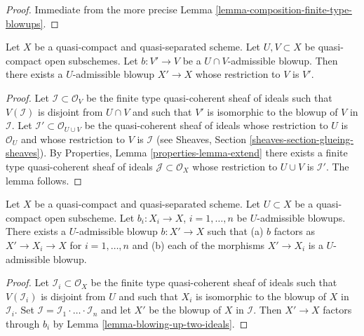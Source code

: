 \begin{proof}
Immediate from the more precise
Lemma \ref{lemma-composition-finite-type-blowups}.
\end{proof}

\begin{lemma}
\label{lemma-extend-admissible-blowups}
Let $X$ be a quasi-compact and quasi-separated scheme.
Let $U, V \subset X$ be quasi-compact open subschemes.
Let $b : V' \to V$ be a $U \cap V$-admissible blowup.
Then there exists a $U$-admissible blowup $X' \to X$
whose restriction to $V$ is $V'$.
\end{lemma}

\begin{proof}
Let $\mathcal{I} \subset \mathcal{O}_V$ be the finite type
quasi-coherent sheaf of ideals such that $V(\mathcal{I})$ is
disjoint from $U \cap V$ and such that $V'$ is isomorphic to the
blowup of $V$ in $\mathcal{I}$. Let
$\mathcal{I}' \subset \mathcal{O}_{U \cup V}$ be the quasi-coherent
sheaf of ideals whose restriction to $U$ is $\mathcal{O}_U$ and
whose restriction to $V$ is $\mathcal{I}$ (see Sheaves, Section
\ref{sheaves-section-glueing-sheaves}).
By Properties, Lemma \ref{properties-lemma-extend}
there exists a finite type quasi-coherent sheaf of ideals
$\mathcal{J} \subset \mathcal{O}_X$ whose restriction to $U \cup V$ is
$\mathcal{I}'$. The lemma follows.
\end{proof}

\begin{lemma}
\label{lemma-dominate-admissible-blowups}
Let $X$ be a quasi-compact and quasi-separated scheme.
Let $U \subset X$ be a quasi-compact open subscheme.
Let $b_i : X_i \to X$, $i = 1, \ldots, n$ be $U$-admissible blowups.
There exists a $U$-admissible blowup $b : X' \to X$ such that
(a) $b$ factors as $X' \to X_i \to X$ for $i = 1, \ldots, n$ and
(b) each of the morphisms $X' \to X_i$ is a $U$-admissible blowup.
\end{lemma}

\begin{proof}
Let $\mathcal{I}_i \subset \mathcal{O}_X$ be the finite type
quasi-coherent sheaf of ideals such that $V(\mathcal{I}_i)$ is
disjoint from $U$ and such that $X_i$ is isomorphic to the
blowup of $X$ in $\mathcal{I}_i$. Set
$\mathcal{I} = \mathcal{I}_1 \cdot \ldots \cdot \mathcal{I}_n$
and let $X'$ be the blowup of $X$ in $\mathcal{I}$. Then
$X' \to X$ factors through $b_i$ by Lemma \ref{lemma-blowing-up-two-ideals}.
\end{proof}

